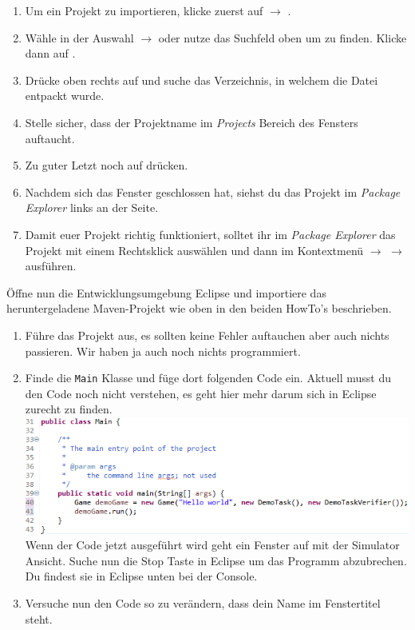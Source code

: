 \begin{Infobox}
    \begin{enumerate}[label=\arabic*.]
        \item Um ein Projekt zu importieren, klicke zuerst auf  $\to$ .
        \item Wähle in der Auswahl  $\to$  oder nutze das Suchfeld oben um  zu finden. Klicke dann auf .
        \item Drücke oben rechts auf  und suche das Verzeichnis, in welchem die Datei \jvkpackage { }entpackt wurde.
        \item Stelle sicher, dass der Projektname im \textit{Projects} Bereich des Fensters auftaucht.
        \item Zu guter Letzt noch auf  drücken.
        \item Nachdem sich das Fenster geschlossen hat, siehst du das Projekt im \textit{Package Explorer} links an der Seite.
        \item Damit euer Projekt richtig funktioniert, solltet ihr im \textit{Package Explorer} das Projekt mit einem Rechtsklick auswählen und dann im Kontextmenü  $\to$  $\to$  ausführen.
    \end{enumerate}
\end{Infobox}

\newpage

Öffne nun die Entwicklungsumgebung Eclipse und importiere das heruntergeladene Maven-Projekt \jvkpackage { } wie oben in den beiden HowTo's beschrieben.

\begin{enumerate}[label=\alph*)]
    \item Führe das Projekt aus, es sollten keine Fehler auftauchen aber auch nichts passieren.
    Wir haben ja auch noch nichts programmiert.
    \item Finde die \texttt{Main} Klasse und füge dort folgenden Code ein.
    Aktuell musst du den Code noch nicht verstehen, es geht hier mehr darum sich in Eclipse zurecht zu finden.\\
    \includegraphics[width=\linewidth]{./figures/code.1.png}\\
    Wenn der Code jetzt ausgeführt wird geht ein Fenster auf mit der Simulator Ansicht.
    Suche nun die Stop Taste in Eclipse um das Programm abzubrechen.
    Du findest sie in Eclipse unten bei der Console.
    \item Versuche nun den Code so zu verändern, dass dein Name im Fenstertitel steht.
\end{enumerate}

